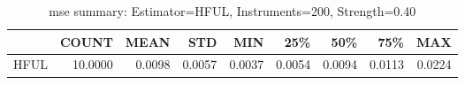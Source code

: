 \begin{table}[ht]
\centering
\caption{mse summary: Estimator=HFUL, Instruments=200, Strength=0.40}
\begin{tabular}{lrrrrrrrr}
\toprule
 & COUNT & MEAN & STD & MIN & 25\% & 50\% & 75\% & MAX \\
\midrule
HFUL & 10.0000 & 0.0098 & 0.0057 & 0.0037 & 0.0054 & 0.0094 & 0.0113 & 0.0224 \\
\bottomrule
\end{tabular}
\end{table}
